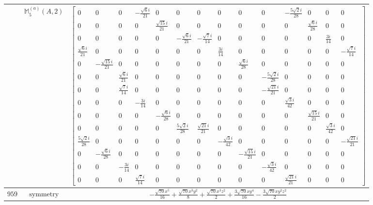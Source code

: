 \documentclass[fleqn,8pt,landscape]{jsarticle}
\begin{document}
\begin{longtable}{ccc}
$  $ & $ \mathbb{M}_{5}^{(a)}(A,2) $ & $ \begin{bmatrix} 0 & 0 & 0 & - \frac{\sqrt{6} i}{21} & 0 & 0 & 0 & 0 & 0 & 0 & - \frac{5 \sqrt{2} i}{28} & 0 & 0 & 0 \\ 0 & 0 & 0 & 0 & \frac{\sqrt{15} i}{21} & 0 & 0 & 0 & 0 & 0 & 0 & \frac{\sqrt{6} i}{28} & 0 & 0 \\ 0 & 0 & 0 & 0 & 0 & - \frac{\sqrt{6} i}{21} & - \frac{\sqrt{7} i}{14} & 0 & 0 & 0 & 0 & 0 & \frac{3 i}{14} & 0 \\ \frac{\sqrt{6} i}{21} & 0 & 0 & 0 & 0 & 0 & 0 & \frac{3 i}{14} & 0 & 0 & 0 & 0 & 0 & - \frac{\sqrt{7} i}{14} \\ 0 & - \frac{\sqrt{15} i}{21} & 0 & 0 & 0 & 0 & 0 & 0 & \frac{\sqrt{6} i}{28} & 0 & 0 & 0 & 0 & 0 \\ 0 & 0 & \frac{\sqrt{6} i}{21} & 0 & 0 & 0 & 0 & 0 & 0 & - \frac{5 \sqrt{2} i}{28} & 0 & 0 & 0 & 0 \\ 0 & 0 & \frac{\sqrt{7} i}{14} & 0 & 0 & 0 & 0 & 0 & 0 & - \frac{\sqrt{21} i}{21} & 0 & 0 & 0 & 0 \\ 0 & 0 & 0 & - \frac{3 i}{14} & 0 & 0 & 0 & 0 & 0 & 0 & \frac{\sqrt{3} i}{42} & 0 & 0 & 0 \\ 0 & 0 & 0 & 0 & - \frac{\sqrt{6} i}{28} & 0 & 0 & 0 & 0 & 0 & 0 & \frac{\sqrt{15} i}{21} & 0 & 0 \\ 0 & 0 & 0 & 0 & 0 & \frac{5 \sqrt{2} i}{28} & \frac{\sqrt{21} i}{21} & 0 & 0 & 0 & 0 & 0 & \frac{\sqrt{3} i}{42} & 0 \\ \frac{5 \sqrt{2} i}{28} & 0 & 0 & 0 & 0 & 0 & 0 & - \frac{\sqrt{3} i}{42} & 0 & 0 & 0 & 0 & 0 & - \frac{\sqrt{21} i}{21} \\ 0 & - \frac{\sqrt{6} i}{28} & 0 & 0 & 0 & 0 & 0 & 0 & - \frac{\sqrt{15} i}{21} & 0 & 0 & 0 & 0 & 0 \\ 0 & 0 & - \frac{3 i}{14} & 0 & 0 & 0 & 0 & 0 & 0 & - \frac{\sqrt{3} i}{42} & 0 & 0 & 0 & 0 \\ 0 & 0 & 0 & \frac{\sqrt{7} i}{14} & 0 & 0 & 0 & 0 & 0 & 0 & \frac{\sqrt{21} i}{21} & 0 & 0 & 0 \end{bmatrix} $ \\ \hline
$ 959 $ & $ \text{symmetry} $ & $ - \frac{\sqrt{70} x^{5}}{16} + \frac{\sqrt{70} x^{3} y^{2}}{8} + \frac{\sqrt{70} x^{3} z^{2}}{2} + \frac{3 \sqrt{70} x y^{4}}{16} - \frac{3 \sqrt{70} x y^{2} z^{2}}{2} $ \\

\end{longtable}
\end{document}
